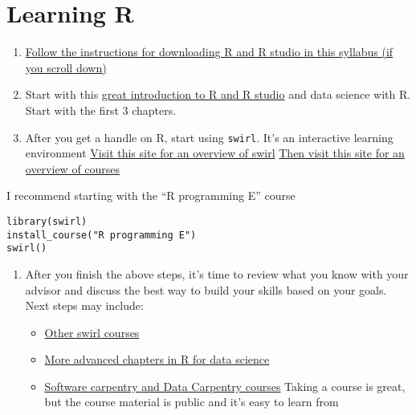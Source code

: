 \documentclass[
  letterpaper,
  DIV=11,
  numbers=noendperiod]{scrreprt}
\begin{document}
\hypertarget{learning-r}{%
\section*{\texorpdfstring{\textbf{Learning
R}}{Learning R}}\label{learning-r}}


\begin{enumerate}
\def\labelenumi{\arabic{enumi}.}
\item
  \href{https://docs.google.com/document/d/1-qm-gVOIb-k61PxlQvav_GZXgmZP4t7q1fjs4BN_Ov8/edit\#heading=h.jl4d8sgkpjrk}{Follow
  the instructions for downloading R and R studio in this syllabus (if
  you scroll down)}
\item
  Start with this
  \href{https://rafalab.github.io/dsbook/getting-started.html}{great
  introduction to R and R studio} and data science with R. Start with
  the first 3 chapters.
\item
  After you get a handle on R, start using \texttt{swirl}. It's an
  interactive learning environment
  \href{https://swirlstats.com/students.html}{Visit this site for an
  overview of swirl}
  \href{https://github.com/swirldev/swirl_courses\#swirl-courses}{Then
  visit this site for an overview of courses}
\end{enumerate}

I recommend starting with the ``R programming E'' course

\begin{verbatim}
library(swirl)
install_course("R programming E")
swirl()
\end{verbatim}

\begin{enumerate}
\def\labelenumi{\arabic{enumi}.}
\item
  After you finish the above steps, it's time to review what you know
  with your advisor and discuss the best way to build your skills based
  on your goals. Next steps may include:

  \begin{itemize}
  \item
    \href{https://swirlstats.com/scn/title.html}{Other swirl courses}
  \item
    \href{https://rafalab.github.io/dsbook/getting-started.html}{More
    advanced chapters in R for data science}
  \item
    \href{https://carpentries.org/}{Software carpentry and Data
    Carpentry courses} Taking a course is great, but the course material
    is public and it's easy to learn from
  \end{itemize}
\end{enumerate}
\end{document}
